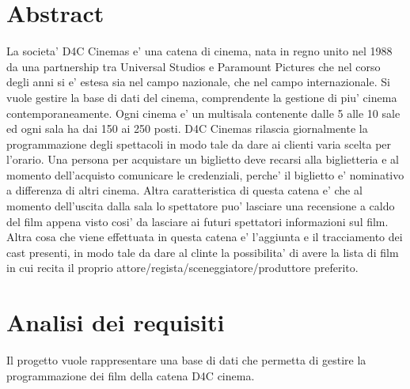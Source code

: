 \documentclass[10pt]{article}
\begin{document}
\begin{titlepage}
		\vfill\vfill\vfill %
		
		
		
		
		
		\vfill %
		\tableofcontents
	\end{titlepage}
	\section{Abstract}	
	La societa' D4C Cinemas e' una catena di cinema, nata in regno unito nel 1988 da una partnership tra Universal Studios e Paramount Pictures che nel corso degli anni si e' estesa sia nel campo nazionale, che nel campo internazionale. Si vuole gestire la base di dati del cinema, comprendente la gestione di piu' cinema contemporaneamente. Ogni cinema e' un multisala contenente dalle 5 alle 10 sale ed ogni sala ha dai 150 ai 250 posti. D4C Cinemas rilascia giornalmente la programmazione degli spettacoli in modo tale da dare ai clienti varia scelta per l'orario. Una persona per acquistare un biglietto deve recarsi alla biglietteria e al momento dell'acquisto comunicare le credenziali, perche' il biglietto e' nominativo a differenza di altri cinema. Altra caratteristica di questa catena e' che al momento dell'uscita dalla sala lo spettatore puo' lasciare una recensione a caldo del film appena visto cosi' da lasciare ai futuri spettatori informazioni sul film. Altra cosa che viene effettuata in questa catena e' l'aggiunta e il tracciamento dei cast presenti, in modo tale da dare al clinte la possibilita' di avere la lista di film in cui recita il proprio attore/regista/sceneggiatore/produttore preferito.
	\section{Analisi dei requisiti}
	
	Il progetto vuole rappresentare una base di dati che permetta di gestire la programmazione dei film della catena D4C cinema.
			
\end{document}

